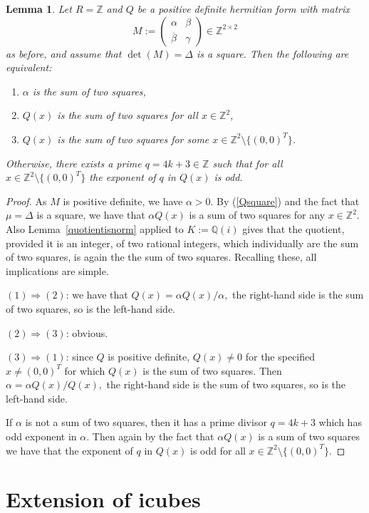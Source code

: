 \documentclass[11pt]{amsart}
\newcommand{\ZZ}{\mathbb{Z}}
\newcommand{\QQ}{\mathbb{Q}}
\newtheorem{lemma}[proposition]{Lemma}
\theoremstyle{definition}
\theoremstyle{remark}
\begin{document}
\begin{lemma}\label{squaredetlem}
Let $R=\mathbb Z$ and $Q$ be a positive definite hermitian form with matrix
\[
M:=\begin{pmatrix} \alpha & \beta \\ \overline\beta & \gamma \end{pmatrix} \in\ZZ^{2\times 2}
\]
as before, and assume that $\det(M)=\Delta$ is a square. Then the following are equivalent:
\begin{enumerate}
\item $\alpha$ is the sum of two squares,
\item $Q(x)$ is the sum of two squares for all $x\in\mathbb Z^2$,
\item $Q(x)$ is the sum of two squares for some 
$x\in\mathbb Z^2\setminus\{(0,0)^T\}$.
\end{enumerate}
Otherwise, there exists a prime $q=4k+3\in\mathbb Z$ such that for all $x\in\mathbb Z^2\setminus\{(0,0)^T\}$ the exponent of  $q$ in $Q(x)$ is odd.
\end{lemma}

\begin{proof}
As $M$ is positive definite, we have $\alpha>0$. By (\ref{Qsquare}) and the fact that $\mu=\Delta$ is a square, we have that $\alpha Q(x)$ is a sum of two squares for any $x\in\mathbb Z^2$. Also Lemma~\ref{quotientisnorm} applied to $K:=\QQ(i)$ gives that the quotient, provided it is an integer, of two rational integers, which individually are the sum of two squares, is again the the sum of two squares. Recalling these, all implications are simple.

$(1) \Rightarrow (2)$: we have that $Q(x)=\alpha Q(x)/\alpha,$
the right-hand side is the sum of two squares, so is the left-hand side.

$(2) \Rightarrow (3)$: obvious.

$(3) \Rightarrow (1)$: since $Q$ is positive definite, $Q(x)\neq 0$ for the specified $x\neq (0,0)^T$ for which $Q(x)$ is the sum of two squares. Then $\alpha=\alpha Q(x)/Q(x),$ the right-hand side is the sum of two squares, so is the left-hand side.

If $\alpha$ is not a sum of two squares, then it has a prime divisor $q=4k+3$ which has odd exponent in $\alpha$. Then again by the fact that $\alpha Q(x)$ is a sum of two squares we have that the exponent of $q$ in $Q(x)$ is odd for all $x\in\mathbb Z^2\setminus\{(0,0)^T\}$.
\end{proof}

\section{Extension of icubes}
\end{document}
